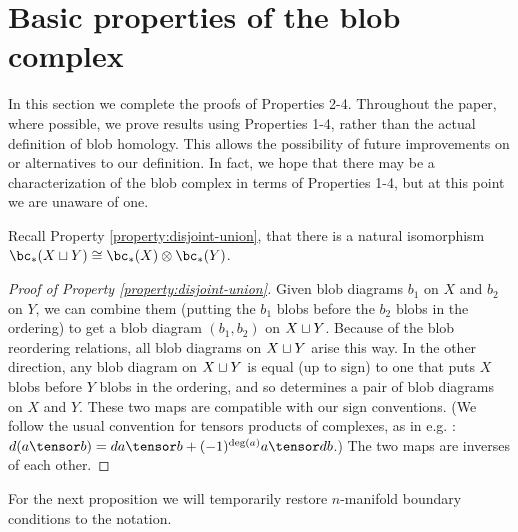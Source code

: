 
\section{Basic properties of the blob complex}
\label{sec:basic-properties}

In this section we complete the proofs of Properties 2-4.
Throughout the paper, where possible, we prove results using Properties 1-4, 
rather than the actual definition of blob homology.
This allows the possibility of future improvements on or alternatives to our definition.
In fact, we hope that there may be a characterization of the blob complex in 
terms of Properties 1-4, but at this point we are unaware of one.

Recall Property \ref{property:disjoint-union}, 
that there is a natural isomorphism $\bc_*(X \du Y) \cong \bc_*(X) \otimes \bc_*(Y)$.

\begin{proof}[Proof of Property \ref{property:disjoint-union}]
Given blob diagrams $b_1$ on $X$ and $b_2$ on $Y$, we can combine them
(putting the $b_1$ blobs before the $b_2$ blobs in the ordering) to get a
blob diagram $(b_1, b_2)$ on $X \sqcup Y$.
Because of the blob reordering relations, all blob diagrams on $X \sqcup Y$ arise this way.
In the other direction, any blob diagram on $X\sqcup Y$ is equal (up to sign)
to one that puts $X$ blobs before $Y$ blobs in the ordering, and so determines
a pair of blob diagrams on $X$ and $Y$.
These two maps are compatible with our sign conventions.
(We follow the usual convention for tensors products of complexes, 
as in e.g. \cite{MR1438306}: $d(a \tensor b) = da \tensor b + (-1)^{\deg(a)} a \tensor db$.)
The two maps are inverses of each other.
\end{proof}

For the next proposition we will temporarily restore $n$-manifold boundary
conditions to the notation.

